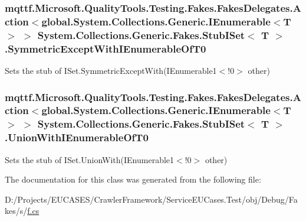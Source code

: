 \hypertarget{class_system_1_1_collections_1_1_generic_1_1_fakes_1_1_stub_i_set_3_01_t_01_4_aef18e5e113671e5b90298b686da3a514}{
\subsubsection[{Symmetric\-Except\-With\-I\-Enumerable\-Of\-T0}]{\setlength{\rightskip}{0pt plus 5cm}mqttf.\-Microsoft.\-Quality\-Tools.\-Testing.\-Fakes.\-Fakes\-Delegates.\-Action$<$global.\-System.\-Collections.\-Generic.\-I\-Enumerable$<$T$>$ $>$ System.\-Collections.\-Generic.\-Fakes.\-Stub\-I\-Set$<$ T $>$.Symmetric\-Except\-With\-I\-Enumerable\-Of\-T0}}\label{class_system_1_1_collections_1_1_generic_1_1_fakes_1_1_stub_i_set_3_01_t_01_4_aef18e5e113671e5b90298b686da3a514}


Sets the stub of I\-Set{.\-Symmetric\-Except\-With(I\-Enumerable}1$<$!0$>$ other)

\hypertarget{class_system_1_1_collections_1_1_generic_1_1_fakes_1_1_stub_i_set_3_01_t_01_4_a381fbc052c2bf5eb2243af62bb78fe9f}{
\subsubsection[{Union\-With\-I\-Enumerable\-Of\-T0}]{\setlength{\rightskip}{0pt plus 5cm}mqttf.\-Microsoft.\-Quality\-Tools.\-Testing.\-Fakes.\-Fakes\-Delegates.\-Action$<$global.\-System.\-Collections.\-Generic.\-I\-Enumerable$<$T$>$ $>$ System.\-Collections.\-Generic.\-Fakes.\-Stub\-I\-Set$<$ T $>$.Union\-With\-I\-Enumerable\-Of\-T0}}\label{class_system_1_1_collections_1_1_generic_1_1_fakes_1_1_stub_i_set_3_01_t_01_4_a381fbc052c2bf5eb2243af62bb78fe9f}


Sets the stub of I\-Set{.\-Union\-With(I\-Enumerable}1$<$!0$>$ other)



The documentation for this class was generated from the following file\-:\begin{DoxyCompactItemize}
\item 
D\-:/\-Projects/\-E\-U\-C\-A\-S\-E\-S/\-Crawler\-Framework/\-Service\-E\-U\-Cases.\-Test/obj/\-Debug/\-Fakes/s/\hyperlink{s_2f_8cs}{f.\-cs}\end{DoxyCompactItemize}
